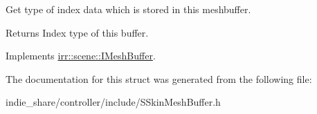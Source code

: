 Get type of index data which is stored in this meshbuffer. 

\begin{DoxyReturn}{Returns}
Index type of this buffer. 
\end{DoxyReturn}


Implements \hyperlink{classirr_1_1scene_1_1IMeshBuffer_a8a993431c2c35420b62a577dc18dbdc2}{irr\+::scene\+::\+I\+Mesh\+Buffer}.



The documentation for this struct was generated from the following file\+:\begin{DoxyCompactItemize}
\item 
indie\+\_\+share/controller/include/S\+Skin\+Mesh\+Buffer.\+h\end{DoxyCompactItemize}

